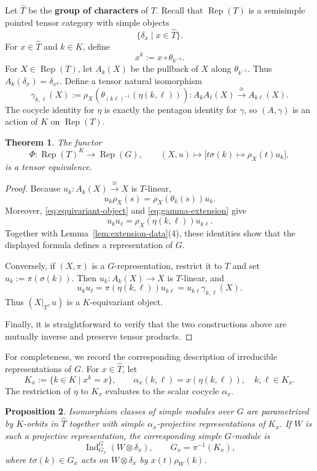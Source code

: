 \documentclass{amsart}
\newtheorem{theorem}{Theorem}[section]
\newtheorem{proposition}[theorem]{Proposition}
\theoremstyle{definition}
\newcommand{\Rep}{\operatorname{Rep}}
\newcommand{\Ind}{\operatorname{Ind}}
\numberwithin{equation}{section}
\begin{document}
Let $\widehat{T}$ be the {\bf group of characters} of $T$. Recall that $\Rep(T)$ is a semisimple pointed tensor category with simple objects 
$$\{\delta_x\mid x\in \widehat{T}\}.$$
For $x\in \widehat{T}$ and $k\in K$, define
\[
 x^k:=x\circ\theta_{k^{-1}}.
\]
For $X\in\Rep(T)$, let $A_k(X)$ be the pullback of $X$ along $\theta_{k^{-1}}$.
Thus $A_k(\delta_x)=\delta_{x^k}$.  Define a tensor natural isomorphism
\begin{equation}\label{eq:gamma-extension}
 \gamma_{k,\ell}(X)
 :=\rho_X\!\left(\theta_{(k\ell)^{-1}}(\eta(k,\ell))\right)
 :A_kA_\ell(X)\xrightarrow{\cong}A_{k\ell}(X).
\end{equation}
The cocycle identity for $\eta$ is exactly the pentagon identity for $\gamma$, so
$(A,\gamma)$ is an action of $K$ on $\Rep(T)$.

\begin{theorem}\label{thm:tensor-equivalence}
The functor
\[
 \Phi:\Rep(T)^K\longrightarrow\Rep(G),
 \qquad
 (X,u)\longmapsto\bigl[t\sigma(k)\mapsto\rho_X(t)u_k\bigr],
\]
is a tensor equivalence.
\end{theorem}

\begin{proof}
Because $u_k:A_k(X)\xrightarrow{\cong} X$ is $T$-linear,
\[
 u_k\rho_X(s)=\rho_X(\theta_k(s))u_k.
\]
Moreover, \eqref{eq:equivariant-object} and \eqref{eq:gamma-extension} give
\[
 u_ku_\ell=\rho_X(\eta(k,\ell))u_{k\ell}.
\]
Together with Lemma~\ref{lem:extension-data}(4), these identities show that the
displayed formula defines a representation of $G$.

Conversely, if $(X,\pi)$ is a $G$-representation, restrict it to $T$ and set
$u_k:=\pi(\sigma(k))$.  Then $u_k:A_k(X)\to X$ is $T$-linear, and
\[
 u_ku_\ell=\pi(\eta(k,\ell))u_{k\ell}
 =u_{k\ell}\gamma_{k,\ell}(X).
\]
Thus $(X|_T,u)$ is a $K$-equivariant object.  

Finally, it is straightforward to verify that the two constructions above are mutually
inverse and preserve tensor products.
\end{proof}

For completeness, we record the corresponding description of irreducible
representations of $G$.  For $x\in \widehat{T}$, let
\[
 K_x:=\{k\in K\mid x^k=x\},
 \qquad
 \alpha_x(k,\ell)=x(\eta(k,\ell)),\quad k,\ell\in K_x.
\]
The restriction of $\eta$ to $K_x$ evaluates to the scalar cocycle $\alpha_x$.

\begin{proposition}\label{prop:simple-G-modules}
Isomorphism classes of simple modules over $G$ are parametrized by $K$-orbits in $\widehat{T}$
together with simple $\alpha_x$-projective representations of $K_x$.  If $W$ is
such a projective representation, the corresponding simple $G$-module is
\[
 \Ind_{G_x}^{G}(W\otimes\delta_x),
 \qquad G_x=\pi^{-1}(K_x),
\]
where $t\sigma(k)\in G_x$ acts on $W\otimes\delta_x$ by
$x(t)\rho_W(k)$.
\end{proposition}
\end{document}
